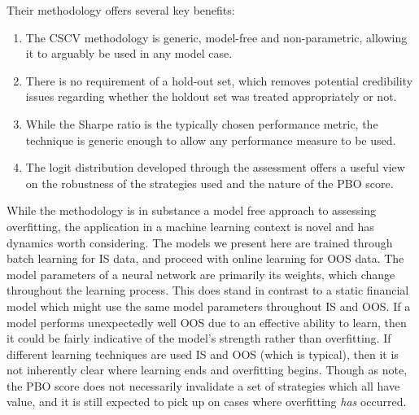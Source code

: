 \documentclass[a4paper,11pt,oneside]{article}
\theoremstyle{plain}
\theoremstyle{definition}
\begin{document}
	Their methodology offers several key benefits:
	\begin{enumerate}
		\item The CSCV methodology is generic, model-free and non-parametric, allowing it to arguably be used in any model case.
		\item There is no requirement of a hold-out set, which removes potential credibility issues regarding whether the holdout set was treated appropriately or not.
		\item While the Sharpe ratio is the typically chosen performance metric, the technique is generic enough to allow any performance measure to be used.
		\item The logit distribution developed through the assessment offers a useful view on the robustness of the strategies used and the nature of the PBO score.
	\end{enumerate}
	
	\texttt{}\newline
	While the methodology is in substance a model free approach to assessing overfitting, the application in a machine learning context is novel and has dynamics worth considering. The models we present here are trained through batch learning for IS data, and proceed with online learning for OOS data. The model parameters of a neural network are primarily its weights, which change throughout the learning process. This does stand in contrast to a static financial model which might use the same model parameters throughout IS and OOS. If a model performs unexpectedly well OOS due to an effective ability to learn, then it could be fairly indicative of the model's strength rather than overfitting. If different learning techniques are used IS and OOS (which is typical), then it is not inherently clear where learning ends and overfitting begins. Though as \citet{BailyPBO} note, the PBO score does not necessarily invalidate a set of strategies which all have value, and it is still expected to pick up on cases where overfitting \textit{has} occurred. \newline 
	
\end{document}
